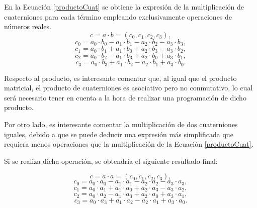\documentclass[conference]{IEEEtran}
\begin{document}
En la Ecuación \ref{productoCuat} se obtiene la expresión de la multiplicación de cuaterniones para cada término empleando exclusivamente operaciones de números reales.
\begin{equation}
    \label{productoCuat}
    c = a\cdot b = (c_{0}, c_{1}, c_{2}, c_{3}),
\end{equation}
\begin{equation*}
    c_{0} = a_{0} \cdot b_{0} - a_{1} \cdot b_{1} - a_{2} \cdot b_{2} - a_{3} \cdot b_{3},
\end{equation*}
\begin{equation*}
    c_{1} = a_{0} \cdot b_{1} + a_{1} \cdot b_{0} + a_{2} \cdot b_{3} - a_{3} \cdot b_{2},
\end{equation*}
\begin{equation*}
    c_{2} = a_{0} \cdot b_{2} - a_{1} \cdot b_{3} + a_{2} \cdot b_{0} + a_{3} \cdot b_{1},
\end{equation*}
\begin{equation*}
    c_{3} = a_{0} \cdot b_{3} + a_{1} \cdot b_{2} - a_{2} \cdot b_{1} + a_{3} \cdot b_{0}.
\end{equation*}

Respecto al producto, es interesante comentar que, al igual que el producto matricial, el producto de cuaterniones es asociativo pero no conmutativo, lo cual será necesario tener en cuenta a la hora de realizar una programación de dicho producto.

Por otro lado, es interesante comentar la multiplicación de dos cuaterniones iguales, debido a que se puede deducir una expresión más simplificada que requiera menos operaciones que la multiplicación de la Ecuación \ref{productoCuat}.

Si se realiza dicha operación, se obtendría el siguiente resultado final:

\begin{equation}
    \label{productoCuatIguales1}
    c = a\cdot a = (c_{0}, c_{1}, c_{2}, c_{3}),
\end{equation}
\begin{equation*}
    c_{0} = a_{0} \cdot a_{0} - a_{1} \cdot a_{1} - a_{2} \cdot a_{2} - a_{3} \cdot a_{3},
\end{equation*}
\begin{equation*}
    c_{1} = a_{0} \cdot a_{1} + a_{1} \cdot a_{0} + a_{2} \cdot a_{3} - a_{3} \cdot a_{2},
\end{equation*}
\begin{equation*}
    c_{2} = a_{0} \cdot a_{2} - a_{1} \cdot a_{3} + a_{2} \cdot a_{0} + a_{3} \cdot a_{1},
\end{equation*}
\begin{equation*}
    c_{3} = a_{0} \cdot a_{3} + a_{1} \cdot a_{2} - a_{2} \cdot a_{1} + a_{3} \cdot a_{0}.
\end{equation*}
\end{document}
